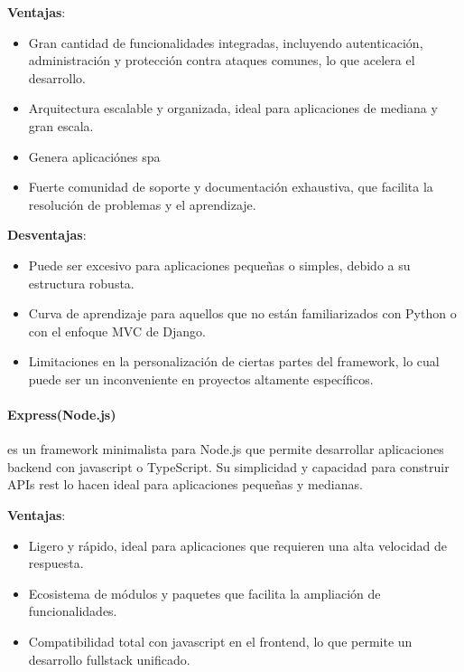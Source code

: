 \textbf{Ventajas}: \begin{itemize} \item Gran cantidad de funcionalidades integradas, incluyendo autenticación, administración y protección contra ataques comunes, lo que acelera el desarrollo. \item Arquitectura escalable y organizada, ideal para aplicaciones de mediana y gran escala. \item Genera aplicaciónes \gls{spa}~\cite{fenollosa2022spa} \item Fuerte comunidad de soporte y documentación exhaustiva, que facilita la resolución de problemas y el aprendizaje. \end{itemize}

\textbf{Desventajas}: \begin{itemize} \item Puede ser excesivo para aplicaciones pequeñas o simples, debido a su estructura robusta. \item Curva de aprendizaje para aquellos que no están familiarizados con Python o con el enfoque MVC de Django. \item Limitaciones en la personalización de ciertas partes del \gls{framework}, lo cual puede ser un inconveniente en proyectos altamente específicos. \end{itemize}

\paragraph{Express(Node.js)~\cite{express}} es un \gls{framework} minimalista para Node.js que permite desarrollar aplicaciones \gls{backend} con \gls{javascript} o TypeScript. Su simplicidad y capacidad para construir \glspl{API} \gls{rest} lo hacen ideal para aplicaciones pequeñas y medianas.

\textbf{Ventajas}:
\begin{itemize}
    \item Ligero y rápido, ideal para aplicaciones que requieren una alta velocidad de respuesta.
    \item Ecosistema de módulos y paquetes que facilita la ampliación de funcionalidades.
    \item Compatibilidad total con \gls{javascript} en el \gls{frontend}, lo que permite un desarrollo \gls{fullstack} unificado.
\end{itemize}

